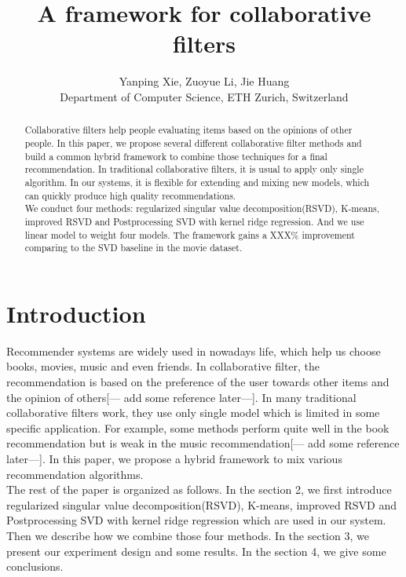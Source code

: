 \documentclass[10pt,conference,compsocconf]{IEEEtran}
\begin{document}
\title{A framework for collaborative filters}

\author{
  Yanping Xie, Zuoyue Li, Jie Huang\\
  Department of Computer Science, ETH Zurich, Switzerland
}

\maketitle

\begin{abstract}
  Collaborative filters help people evaluating items based on the opinions of other 
people. In this paper, we propose several different collaborative filter methods and build a common
hybrid framework to combine those techniques for a final recommendation. In traditional collaborative filters, it is usual to 
apply only single algorithm. In our systems, it is flexible for extending and mixing new models, 
which can  quickly produce high quality recommendations. \\
We conduct four methods: regularized singular value decomposition(RSVD), K-means, improved RSVD and Postprocessing SVD with kernel ridge regression. And we use linear model to weight four models. The framework gains a XXX\% improvement comparing to the SVD baseline in the movie dataset.

\end{abstract}

\section{Introduction}

Recommender systems are widely used in nowadays life, which help us choose books, movies, music and even friends. In collaborative filter, the recommendation is based on the preference of the user towards other items and the opinion of others[--- add some reference later---]. In many traditional collaborative filters work, they use only single model which is limited in some specific application. For example, some methods perform quite well in the book recommendation but is weak in the music recommendation[--- add some reference later---]. In this paper, we propose a hybrid framework to mix various recommendation algorithms. \\
The rest of the paper is organized as follows. In the section 2, we first introduce regularized singular value decomposition(RSVD), K-means, improved RSVD and Postprocessing SVD with kernel ridge regression which are used in our system. Then we describe how we combine those four methods. In the section 3, we present our experiment design and some results. In the section 4, we give some conclusions. 
\end{document}
